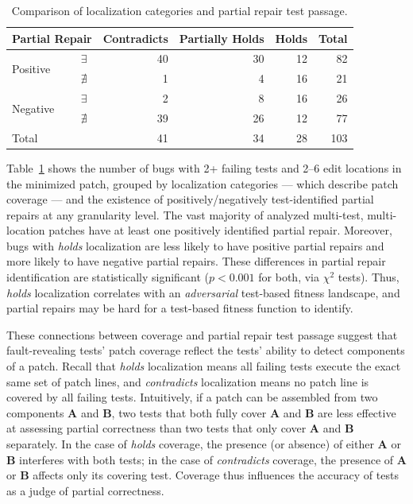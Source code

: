 \documentclass[10pt, conference]{IEEEtran}
\begin{document}
\begin{table}
  {\begin{center}
      \begin{tabular} {llrrrr}
        \toprule
        \multicolumn{2}{c}{Partial Repair} & Contradicts & Partially Holds & Holds & Total \\
        \midrule
        \multirow{2}{*}{Positive} & $\exists$  & 40 & 30 & 12 &  82 \\
                                  & $\nexists$ &  1 &  4 & 16 &  21 \\
        \midrule
        \multirow{2}{*}{Negative} & $\exists$  &  2 &  8 & 16 &  26 \\
                                  & $\nexists$ & 39 & 26 & 12 &  77 \\
        \midrule
        Total                     &            & 41 & 34 & 28 & 103 \\
        \bottomrule
      \end{tabular}
    \end{center}
  }
  \caption{Comparison of localization categories and partial repair test passage.}
  \label{tab:cov_fitness}
\end{table}
 
Table~\ref{tab:cov_fitness} shows the number of bugs with 2+ failing tests
and 2--6 edit locations in the minimized patch, grouped by localization categories 
--- which describe patch coverage --- and the existence of positively/negatively
test-identified partial repairs at any granularity level.
The vast majority of analyzed multi-test, multi-location patches have at least
one positively identified partial repair.
Moreover, bugs with \emph{holds} localization are less likely to have
positive partial repairs and more likely to have negative partial repairs.
These differences in partial repair identification are statistically significant 
($p < 0.001$ for both, via $\chi^2$ tests).
Thus, \emph{holds} localization correlates with an
\emph{adversarial} test-based fitness landscape,
and partial repairs may be hard for a test-based
fitness function to identify.

These connections between coverage and partial repair test passage
suggest that fault-revealing tests' patch coverage reflect the tests' ability
to detect components of a patch.
Recall that \emph{holds} localization means all failing tests execute 
the exact same set of patch lines, and \emph{contradicts} localization 
means no patch line is covered by all failing tests.
Intuitively, if a patch can be
assembled from two components \textbf{A} and \textbf{B}, two tests that both
fully cover \textbf{A} and \textbf{B} are less effective at assessing partial
correctness than two tests that only cover \textbf{A} and \textbf{B} separately.
In the case of \emph{holds} coverage, the presence (or absence) of either \textbf{A} or 
\textbf{B} interferes with both tests; in the case of \emph{contradicts} coverage, the presence of 
\textbf{A} or \textbf{B} affects only its covering test.
Coverage thus influences the accuracy of tests as a judge of partial correctness.
\end{document}
